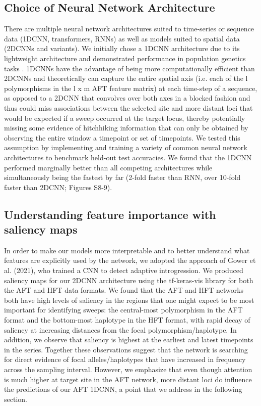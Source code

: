 \subsection{Choice of Neural Network Architecture}

There are multiple neural network architectures suited to time-series or sequence data (1DCNN, transformers, RNNs) as well as models suited to spatial data (2DCNNs and variants). We initially chose a 1DCNN architecture due to its lightweight architecture and demonstrated performance in population genetics tasks \cite{flagelUnreasonableEffectivenessConvolutional2019}. 1DCNNs have the advantage of being more computationally efficient than 2DCNNs and theoretically can capture the entire spatial axis (i.e. each of the l polymorphisms in the l x m AFT feature matrix) at each time-step of a sequence, as opposed to a 2DCNN that convolves over both axes in a blocked fashion and thus could miss associations between the selected site and more distant loci that would be expected if a sweep occurred at the target locus, thereby potentially missing some evidence of hitchhiking information that can only be obtained by observing the entire window a timepoint or set of timepoints. We tested this assumption by implementing and training a variety of common neural network architectures to benchmark held-out test accuracies. We found that the 1DCNN performed marginally better than all competing architectures while simultaneously being the fastest by far (2-fold faster than RNN, over 10-fold faster than 2DCNN; Figures S8-9).  \\

\subsection{Understanding feature importance with saliency maps}

In order to make our models more interpretable and to better understand what features are explicitly used by the network, we adopted the approach of Gower et al. (2021), who trained a CNN to detect adaptive introgression. We produced saliency maps for our 2DCNN architecture using the tf-keras-vis library \cite{kubotaTfkerasvis2022} for both the AFT and HFT data formats. We found that the AFT and HFT networks both have high levels of saliency in the regions that one might expect to be most important for identifying sweeps: the central-most polymorphism in the AFT format and the bottom-most haplotype in the HFT format, with rapid decay of saliency at increasing distances from the focal polymorphism/haplotype. In addition, we observe that saliency is highest at the earliest and latest timepoints in the series. Together these observations suggest that the network is searching for direct evidence of focal alleles/haplotypes that have increased in frequency across the sampling interval. However, we emphasize that even though attention is much higher at target site in the AFT network, more distant loci do influence the predictions of our AFT 1DCNN, a point that we address in the following section. \\

